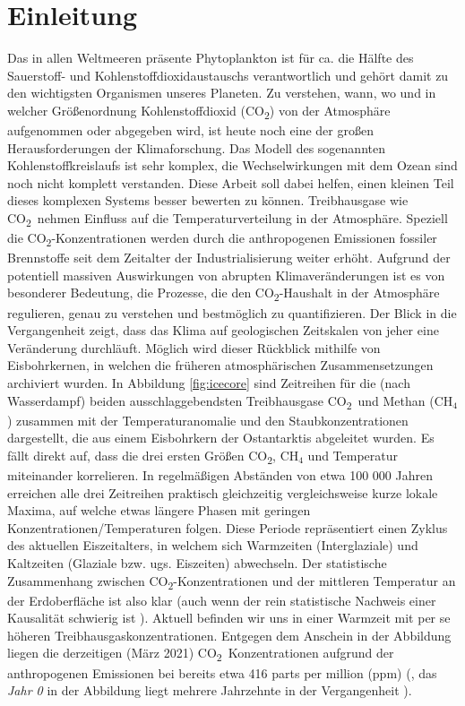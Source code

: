 \documentclass[12pt,a4paper,onecolumn]{scrartcl}
\newcommand{\cotwo}{CO\textsubscript{2}}
\begin{document}
\section{Einleitung} \label{sec:einleitung}
\sloppy %
Das in allen Weltmeeren präsente Phytoplankton ist für ca. die Hälfte des Sauerstoff- und Kohlenstoffdioxidaustauschs verantwortlich \citep{Emerson.2009} und gehört damit zu den wichtigsten Organismen unseres Planeten. Zu verstehen, wann, wo und in welcher Größenordnung Kohlenstoffdioxid (\cotwo) von der Atmosphäre aufgenommen oder abgegeben wird, ist heute noch eine der großen Herausforderungen der Klimaforschung. Das Modell des sogenannten Kohlenstoffkreislaufs ist sehr komplex, die Wechselwirkungen mit dem Ozean sind noch nicht komplett verstanden. Diese Arbeit soll dabei helfen, einen kleinen Teil dieses komplexen Systems besser bewerten zu können. Treibhausgase wie \cotwo \ nehmen Einfluss auf die Temperaturverteilung in der Atmosphäre. Speziell die \cotwo -Konzentrationen werden durch die anthropogenen Emissionen fossiler Brennstoffe seit dem Zeitalter der Industrialisierung weiter erhöht. Aufgrund der potentiell massiven Auswirkungen von abrupten Klimaveränderungen \citep{IPCCpol.2018} ist es von besonderer Bedeutung, die Prozesse, die den \cotwo -Haushalt in der Atmosphäre regulieren, genau zu verstehen und bestmöglich zu quantifizieren.  Der Blick in die Vergangenheit zeigt, dass das Klima auf geologischen Zeitskalen von jeher eine Veränderung durchläuft. Möglich wird dieser Rückblick mithilfe von Eisbohrkernen, in welchen die früheren atmosphärischen Zusammensetzungen archiviert wurden. In Abbildung \ref{fig:icecore} sind  Zeitreihen für die (nach Wasserdampf) beiden ausschlaggebendsten Treibhausgase \cotwo \ und Methan (CH$_4$) zusammen mit der Temperaturanomalie und den Staubkonzentrationen dargestellt, die aus einem Eisbohrkern der Ostantarktis abgeleitet wurden. Es fällt direkt auf, dass die drei ersten Größen \cotwo , CH$_4$ und Temperatur miteinander korrelieren. In regelmäßigen Abständen von etwa 100 000 Jahren erreichen alle drei Zeitreihen praktisch gleichzeitig vergleichsweise kurze lokale Maxima, auf welche etwas längere Phasen mit geringen Konzentrationen/Temperaturen folgen. Diese Periode repräsentiert einen Zyklus des aktuellen Eiszeitalters, in welchem sich Warmzeiten (Interglaziale) und Kaltzeiten (Glaziale bzw. ugs. Eiszeiten) abwechseln. Der statistische Zusammenhang zwischen \cotwo -Konzentrationen und der mittleren Temperatur an der Erdoberfläche ist also klar (auch wenn der rein statistische Nachweis einer Kausalität schwierig ist \citep{Stips.2016}). Aktuell befinden wir uns in einer Warmzeit mit per se höheren Treibhausgaskonzentrationen. Entgegen dem Anschein in der Abbildung liegen die derzeitigen (März 2021) \cotwo \ Konzentrationen aufgrund der anthropogenen Emissionen bei bereits etwa 416 parts per million (ppm) (\cite{NASA.06.05.2021}, das \textit{Jahr 0} in der Abbildung liegt mehrere Jahrzehnte in der Vergangenheit \citep{Luthi.2008}). \linebreak
\end{document}

